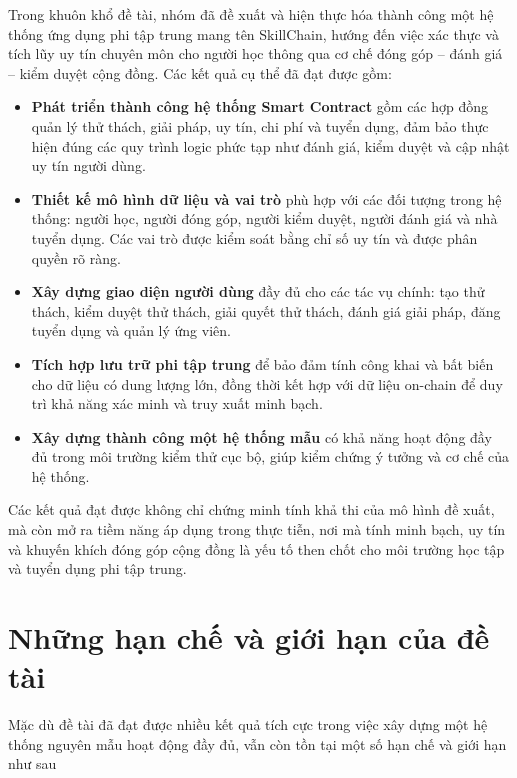 Trong khuôn khổ đề tài, nhóm đã đề xuất và hiện thực hóa thành công một hệ thống ứng dụng phi tập trung mang tên SkillChain, hướng đến việc xác thực và tích lũy uy tín chuyên môn cho người học thông qua cơ chế đóng góp -- đánh giá -- kiểm duyệt cộng đồng.
Các kết quả cụ thể đã đạt được gồm:
\begin{itemize}
  \item \textbf{Phát triển thành công hệ thống Smart Contract} gồm các hợp đồng quản lý thử thách, giải pháp, uy tín, chi phí và tuyển dụng, đảm bảo thực hiện đúng các quy trình logic phức tạp như đánh giá, kiểm duyệt và cập nhật uy tín người dùng.
  \item \textbf{Thiết kế mô hình dữ liệu và vai trò} phù hợp với các đối tượng trong hệ thống: người học, người đóng góp, người kiểm duyệt, người đánh giá và nhà tuyển dụng. Các vai trò được kiểm soát bằng chỉ số uy tín và được phân quyền rõ ràng.
  \item \textbf{Xây dựng giao diện người dùng} đầy đủ cho các tác vụ chính: tạo thử thách, kiểm duyệt thử thách, giải quyết thử thách, đánh giá giải pháp, đăng tuyển dụng và quản lý ứng viên.
  \item \textbf{Tích hợp lưu trữ phi tập trung} để bảo đảm tính công khai và bất biến cho dữ liệu có dung lượng lớn, đồng thời kết hợp với dữ liệu on-chain để duy trì khả năng xác minh và truy xuất minh bạch.
  \item \textbf{Xây dựng thành công một hệ thống mẫu} có khả năng hoạt động đầy đủ trong môi trường kiểm thử cục bộ, giúp kiểm chứng ý tưởng và cơ chế của hệ thống.
\end{itemize}
Các kết quả đạt được không chỉ chứng minh tính khả thi của mô hình đề xuất, mà còn mở ra tiềm năng áp dụng trong thực tiễn, nơi mà tính minh bạch, uy tín và khuyến khích đóng góp cộng đồng là yếu tố then chốt cho môi trường học tập và tuyển dụng phi tập trung.

\section{Những hạn chế và giới hạn của đề tài}

Mặc dù đề tài đã đạt được nhiều kết quả tích cực trong việc xây dựng một hệ thống nguyên mẫu hoạt động đầy đủ, vẫn còn tồn tại một số hạn chế và giới hạn như sau
